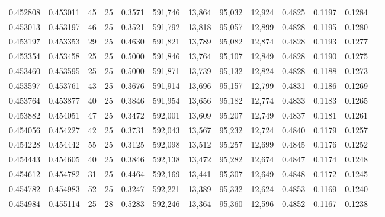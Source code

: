 \begin{tabular}{rrrrrrrrrrrrr}
0.452808 & 0.453011 &    45 &  25 &                                     0.3571 & 591,746 &  13,864 &  95,032 &  12,924 & 0.4825 & 0.1197 & 0.1284 \\
0.453013 & 0.453197 &    46 &  25 &                                     0.3521 & 591,792 &  13,818 &  95,057 &  12,899 & 0.4828 & 0.1195 & 0.1280 \\
0.453197 & 0.453353 &    29 &  25 &                                     0.4630 & 591,821 &  13,789 &  95,082 &  12,874 & 0.4828 & 0.1193 & 0.1277 \\
0.453354 & 0.453458 &    25 &  25 &                                     0.5000 & 591,846 &  13,764 &  95,107 &  12,849 & 0.4828 & 0.1190 & 0.1275 \\
0.453460 & 0.453595 &    25 &  25 &                                     0.5000 & 591,871 &  13,739 &  95,132 &  12,824 & 0.4828 & 0.1188 & 0.1273 \\
0.453597 & 0.453761 &    43 &  25 &                                     0.3676 & 591,914 &  13,696 &  95,157 &  12,799 & 0.4831 & 0.1186 & 0.1269 \\
0.453764 & 0.453877 &    40 &  25 &                                     0.3846 & 591,954 &  13,656 &  95,182 &  12,774 & 0.4833 & 0.1183 & 0.1265 \\
0.453882 & 0.454051 &    47 &  25 &                                     0.3472 & 592,001 &  13,609 &  95,207 &  12,749 & 0.4837 & 0.1181 & 0.1261 \\
0.454056 & 0.454227 &    42 &  25 &                                     0.3731 & 592,043 &  13,567 &  95,232 &  12,724 & 0.4840 & 0.1179 & 0.1257 \\
0.454228 & 0.454442 &    55 &  25 &                                     0.3125 & 592,098 &  13,512 &  95,257 &  12,699 & 0.4845 & 0.1176 & 0.1252 \\
0.454443 & 0.454605 &    40 &  25 &                                     0.3846 & 592,138 &  13,472 &  95,282 &  12,674 & 0.4847 & 0.1174 & 0.1248 \\
0.454612 & 0.454782 &    31 &  25 &                                     0.4464 & 592,169 &  13,441 &  95,307 &  12,649 & 0.4848 & 0.1172 & 0.1245 \\
0.454782 & 0.454983 &    52 &  25 &                                     0.3247 & 592,221 &  13,389 &  95,332 &  12,624 & 0.4853 & 0.1169 & 0.1240 \\
0.454984 & 0.455114 &    25 &  28 &                                     0.5283 & 592,246 &  13,364 &  95,360 &  12,596 & 0.4852 & 0.1167 & 0.1238 \\

\end{tabular}
